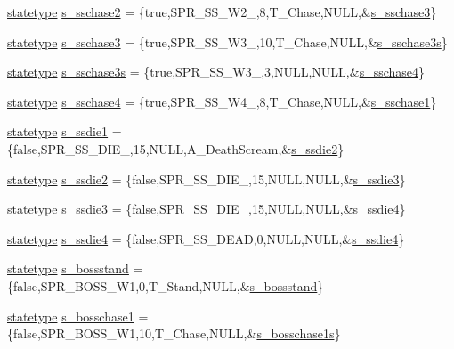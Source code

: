 \begin{DoxyCompactItemize}
\hyperlink{structstatestruct}{statetype} \hyperlink{WL__ACT2_8C_a2a840ea76500e2b74c673759a7f78d8a}{s\_\-sschase2} = \{true,SPR\_\-SS\_\-W2\_,8,T\_\-Chase,NULL,\&\hyperlink{WL__ACT2_8C_a129bdfee154d0007b9520b02ba5b83a5}{s\_\-sschase3}\}
\item 
\hyperlink{structstatestruct}{statetype} \hyperlink{WL__ACT2_8C_a129bdfee154d0007b9520b02ba5b83a5}{s\_\-sschase3} = \{true,SPR\_\-SS\_\-W3\_,10,T\_\-Chase,NULL,\&\hyperlink{WL__ACT2_8C_a728f42d89af0217931bfc3f834bdf06d}{s\_\-sschase3s}\}
\item 
\hyperlink{structstatestruct}{statetype} \hyperlink{WL__ACT2_8C_a728f42d89af0217931bfc3f834bdf06d}{s\_\-sschase3s} = \{true,SPR\_\-SS\_\-W3\_,3,NULL,NULL,\&\hyperlink{WL__ACT2_8C_a21f06af6990617be09e45eb957e3ce55}{s\_\-sschase4}\}
\item 
\hyperlink{structstatestruct}{statetype} \hyperlink{WL__ACT2_8C_a21f06af6990617be09e45eb957e3ce55}{s\_\-sschase4} = \{true,SPR\_\-SS\_\-W4\_,8,T\_\-Chase,NULL,\&\hyperlink{WL__DEF_8H_ae0f8e756abc0877ae24d5fd8e3b88bea}{s\_\-sschase1}\}
\item 
\hyperlink{structstatestruct}{statetype} \hyperlink{WL__ACT2_8C_ab17dfc4394913bd79a55ab99142b43f4}{s\_\-ssdie1} = \{false,SPR\_\-SS\_\-DIE\_,15,NULL,A\_\-DeathScream,\&\hyperlink{WL__ACT2_8C_aafcb04752e08726482a09ab5bc1cdecb}{s\_\-ssdie2}\}
\item 
\hyperlink{structstatestruct}{statetype} \hyperlink{WL__ACT2_8C_aafcb04752e08726482a09ab5bc1cdecb}{s\_\-ssdie2} = \{false,SPR\_\-SS\_\-DIE\_,15,NULL,NULL,\&\hyperlink{WL__ACT2_8C_abe1d5efae7ccb8a411b8f58990e6686d}{s\_\-ssdie3}\}
\item 
\hyperlink{structstatestruct}{statetype} \hyperlink{WL__ACT2_8C_abe1d5efae7ccb8a411b8f58990e6686d}{s\_\-ssdie3} = \{false,SPR\_\-SS\_\-DIE\_,15,NULL,NULL,\&\hyperlink{WL__ACT2_8C_a6c3ddc5927a9f4e0ebb04eb5057927e4}{s\_\-ssdie4}\}
\item 
\hyperlink{structstatestruct}{statetype} \hyperlink{WL__ACT2_8C_a6c3ddc5927a9f4e0ebb04eb5057927e4}{s\_\-ssdie4} = \{false,SPR\_\-SS\_\-DEAD,0,NULL,NULL,\&\hyperlink{WL__ACT2_8C_a6c3ddc5927a9f4e0ebb04eb5057927e4}{s\_\-ssdie4}\}
\item 
\hyperlink{structstatestruct}{statetype} \hyperlink{WL__ACT2_8C_a277ee30ec0f5bb15e1905e1aa40ecd20}{s\_\-bossstand} = \{false,SPR\_\-BOSS\_\-W1,0,T\_\-Stand,NULL,\&\hyperlink{WL__ACT2_8C_a277ee30ec0f5bb15e1905e1aa40ecd20}{s\_\-bossstand}\}
\item 
\hyperlink{structstatestruct}{statetype} \hyperlink{WL__ACT2_8C_a5135f3395ae6c6efc57951117610a58f}{s\_\-bosschase1} = \{false,SPR\_\-BOSS\_\-W1,10,T\_\-Chase,NULL,\&\hyperlink{WL__ACT2_8C_ac6a3ef80511e594150afa045afd3b9b7}{s\_\-bosschase1s}\}

\end{DoxyCompactItemize}
